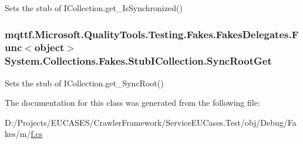 Sets the stub of I\-Collection.\-get\-\_\-\-Is\-Synchronized()

\hypertarget{class_system_1_1_collections_1_1_fakes_1_1_stub_i_collection_a9bd2907951b034c5fbb0d23188b442ed}{
\subsubsection[{Sync\-Root\-Get}]{\setlength{\rightskip}{0pt plus 5cm}mqttf.\-Microsoft.\-Quality\-Tools.\-Testing.\-Fakes.\-Fakes\-Delegates.\-Func$<$object$>$ System.\-Collections.\-Fakes.\-Stub\-I\-Collection.\-Sync\-Root\-Get}}\label{class_system_1_1_collections_1_1_fakes_1_1_stub_i_collection_a9bd2907951b034c5fbb0d23188b442ed}


Sets the stub of I\-Collection.\-get\-\_\-\-Sync\-Root()



The documentation for this class was generated from the following file\-:\begin{DoxyCompactItemize}
\item 
D\-:/\-Projects/\-E\-U\-C\-A\-S\-E\-S/\-Crawler\-Framework/\-Service\-E\-U\-Cases.\-Test/obj/\-Debug/\-Fakes/m/\hyperlink{m_2f_8cs}{f.\-cs}\end{DoxyCompactItemize}
